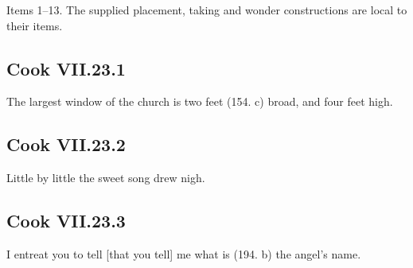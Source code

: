 Items 1–13. The supplied placement, taking and wonder constructions are local to their items.

\par\begin{minipage}{\linewidth}\raggedright
\subsection*{Cook VII.23.1}

The largest window of the church is two feet (154. c) broad, and four feet high.

\end{minipage}\par\addvspace{4pt}

\par\begin{minipage}{\linewidth}\raggedright
\subsection*{Cook VII.23.2}

Little by little the sweet song drew nigh.

\end{minipage}\par\addvspace{4pt}

\par\begin{minipage}{\linewidth}\raggedright
\subsection*{Cook VII.23.3}

I entreat you to tell [that you tell] me what is (194. b) the angel’s name.

\end{minipage}\par\addvspace{4pt}

